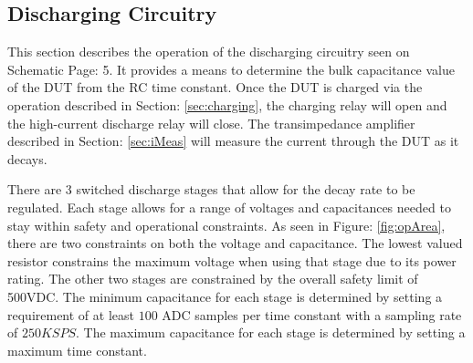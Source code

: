 \subsection{Discharging Circuitry}

This section describes the operation of the discharging circuitry seen on Schematic Page: 5. It provides a means to determine the bulk capacitance value of the DUT from the RC time constant. Once the DUT is charged via the operation described in Section: \ref{sec:charging}, the charging relay will open and the high-current discharge relay will close. The transimpedance amplifier described in Section: \ref{sec:iMeas} will measure the current through the DUT as it decays.

There are 3 switched discharge stages that allow for the decay rate to be regulated. Each stage allows for a range of voltages and capacitances needed to stay within safety and operational constraints. As seen in Figure: \ref{fig:opArea}, there are two constraints on both the voltage and capacitance. The lowest valued resistor constrains the maximum voltage when using that stage due to its power rating. The other two stages are constrained by the overall safety limit of 500VDC. The minimum capacitance for each stage is determined by setting a requirement of at least $100$ ADC samples per time constant with a sampling rate of $250KSPS$. The maximum capacitance for each stage is determined by setting a maximum time constant.



